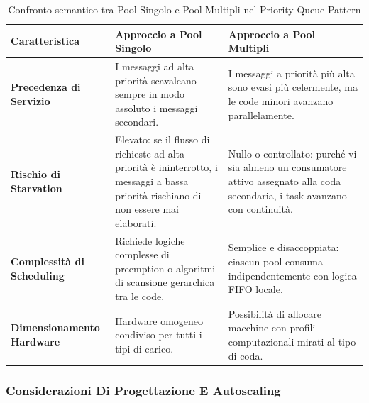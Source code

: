 \documentclass[11pt, a4paper]{article}
\begin{document}
\begin{table}[H]
\centering
\caption{Confronto semantico tra Pool Singolo e Pool Multipli nel Priority Queue Pattern}
\label{tab:priority_queue_comparison}
\begin{tabularx}{\textwidth}{p{3.5cm} X X}
\toprule
\textbf{Caratteristica} & \textbf{Approccio a Pool Singolo} & \textbf{Approccio a Pool Multipli} \\
\midrule
\textbf{Precedenza di Servizio} & I messaggi ad alta priorità scavalcano sempre in modo assoluto i messaggi secondari. & I messaggi a priorità più alta sono evasi più celermente, ma le code minori avanzano parallelamente. \\
\addlinespace
\textbf{Rischio di Starvation} & Elevato: se il flusso di richieste ad alta priorità è ininterrotto, i messaggi a bassa priorità rischiano di non essere mai elaborati. & Nullo o controllato: purché vi sia almeno un consumatore attivo assegnato alla coda secondaria, i task avanzano con continuità. \\
\addlinespace
\textbf{Complessità di Scheduling} & Richiede logiche complesse di preemption o algoritmi di scansione gerarchica tra le code. & Semplice e disaccoppiata: ciascun pool consuma indipendentemente con logica FIFO locale. \\
\addlinespace
\textbf{Dimensionamento Hardware} & Hardware omogeneo condiviso per tutti i tipi di carico. & Possibilità di allocare macchine con profili computazionali mirati al tipo di coda. \\
\bottomrule
\end{tabularx}
\end{table}

\subsubsection{Considerazioni Di Progettazione E Autoscaling}
\end{document}
